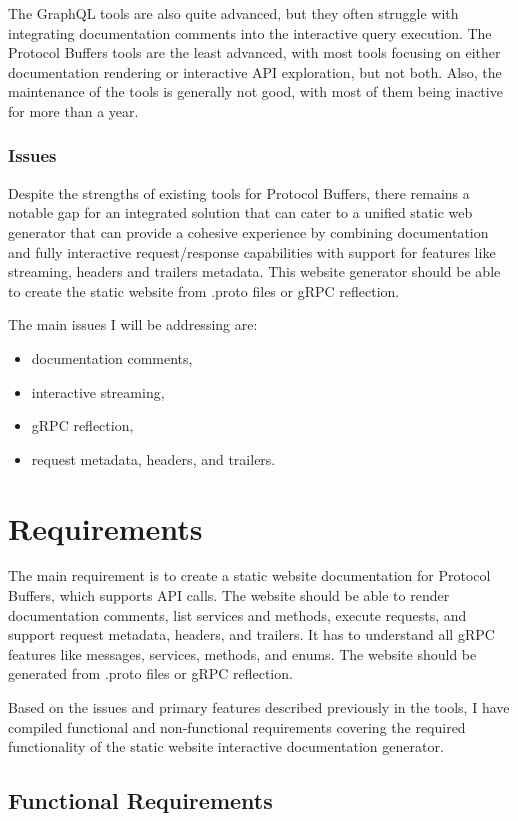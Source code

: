 The GraphQL tools are also quite advanced, but they often struggle with integrating documentation comments into the interactive query execution.
The Protocol Buffers tools are the least advanced, with most tools focusing on either documentation rendering or interactive API exploration, but not both.
Also, the maintenance of the tools is generally not good, with most of them being inactive for more than a year.

\subsubsection{Issues}
Despite the strengths of existing tools for Protocol Buffers, there remains a notable gap for an integrated solution that can cater to a unified static web generator that can provide a cohesive experience by combining documentation and fully interactive request/response capabilities with support for features like streaming, headers and trailers metadata.
This website generator should be able to create the static website from .proto files or gRPC reflection.

The main issues I will be addressing are:
\begin{itemize}
    \item documentation comments,
    \item interactive streaming,
    \item gRPC reflection,
    \item request metadata, headers, and trailers.
\end{itemize}


\section{Requirements}
The main requirement is to create a static website documentation for Protocol Buffers, which supports API calls.
The website should be able to render documentation comments, list services and methods, execute requests, and support request metadata, headers, and trailers.
It has to understand all gRPC features like messages, services, methods, and enums.
The website should be generated from .proto files or gRPC reflection.

Based on the issues and primary features described previously in the tools, I have compiled functional and non-functional requirements covering the required functionality of the static website interactive documentation generator.

\subsection{Functional Requirements}
\newcommand{\functional}[1]{%
    \stepcounter{fcounter}%
    \textcolor{heading}{\textbf{#1}}\\%
}

